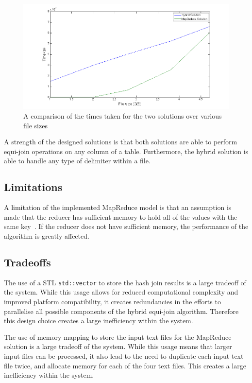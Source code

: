 \documentclass[12pt,twocolumn]{witseiepaper}
\begin{document}
\begin{figure}[h]
	\centering
	\includegraphics[width=1\columnwidth]{comparison.png}
	\caption{A comparison of the times taken for the two solutions over various file sizes}
	\raggedright
	\label{fig:comparison}	
\end{figure}

A strength of the designed solutions is that both solutions are able to perform equi-join operations on any column of a table. Furthermore, the hybrid solution is able to handle any type of delimiter within a file.

\subsection{Limitations}
A limitation of the implemented MapReduce model is that an assumption is made that the reducer has sufficient memory to hold all of the values with the same key~\cite{mapReduceJoin}. If the reducer does not have sufficient memory, the performance of the algorithm is greatly affected.

\subsection{Tradeoffs} \label{sec:tradeoffs}
The use of a STL \texttt{std::vector} to store the hash join results is a large tradeoff of the system. While this usage allows for reduced computational complexity and improved platform compatibility, it creates redundancies in the efforts to parallelise all possible components of the hybrid equi-join algorithm. Therefore this design choice creates a large inefficiency within the system.

The use of memory mapping to store the input text files for the MapReduce solution is a large tradeoff of the system. While this usage means that larger input files can be processed, it also lead to the need to duplicate each input text file twice, and allocate memory for each of the four text files. This creates a large inefficiency within the system.
\end{document}

